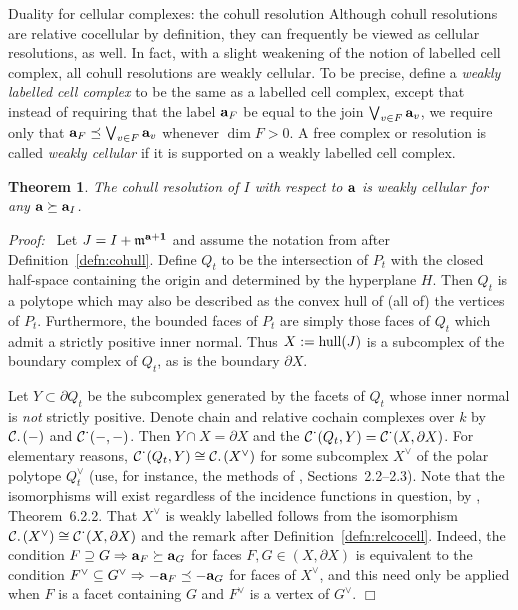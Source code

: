 \documentclass[12pt,leqno]{article}
\newtheorem{thm}{Theorem}[section]
\def\hdot{{^{\textstyle \cdot}}}
\def\ldot{{.{\scriptstyle \,}}}
\def\aa{{{\rm \bf a}}}
\def\mm{{\mathfrak m}}
\begin{document}
\begin{section}{Duality for cellular complexes: the cohull resolution}
Although cohull resolutions are relative cocellular by definition, they
can frequently be viewed as cellular resolutions, as well.  In fact, with
a slight weakening of the notion of labelled cell complex, all cohull
resolutions are weakly cellular.  To be precise, define a {\it weakly
labelled cell complex} to be the same as a labelled cell complex, except
that instead of requiring that the label $\aa_F$ be equal to the join
$\bigvee_{v \in F} \aa_v$, we require only that $\aa_F \preceq \bigvee_{v
\in F} \aa_v$ whenever $\dim F > 0$.  A free complex or resolution is
called {\it weakly cellular} if it is supported on a weakly labelled cell
complex.

\begin{thm} \label{thm:weakly}
The cohull resolution of $I$ with respect to $\aa$ is weakly cellular for
any $\aa \succeq \aa_I$.
\end{thm}
{\it Proof:\ } Let $J = I + \mm^{\aa + {\bf 1}}$ and assume the notation
from after Definition~\ref{defn:cohull}.  Define $Q_t$ to be the
intersection of $P_t$ with the closed half-space containing the origin
and determined by the hyperplane $H$.  Then $Q_t$ is a polytope which may
also be described as the convex hull of (all of) the vertices of $P_t$.
Furthermore, the bounded faces of $P_t$ are simply those faces of $Q_t$
which admit a strictly positive inner normal.  Thus $X := {\rm hull}(J)$
is a subcomplex of the boundary complex of $Q_t$, as is the boundary
$\partial X$.

Let $Y \subset \partial Q_t$ be the subcomplex generated by the facets of
$Q_t$ whose inner normal is {\it not} strictly positive.  Denote chain
and relative cochain complexes over $k$ by ${\cal C}\ldot(-)$ and ${\cal
C}\hdot(-,-)$.  Then $Y \cap X = \partial X$ and the ${\cal
C}\hdot(Q_t,Y) = {\cal C}\hdot(X,\partial X)$.  For elementary reasons,
${\cal C}\hdot(Q_t,Y) \cong {\cal C}\ldot(X^\vee)$ for some subcomplex
$X^\vee$ of the polar polytope $Q_t^\vee$ (use, for instance, the methods
of \cite{Zie}, Sections~2.2--2.3).  Note that the isomorphisms will exist
regardless of the incidence functions in question, by \cite{BH},
Theorem~6.2.2.  That $X^\vee$ is weakly labelled follows from the
isomorphism ${\cal C}\ldot(X^\vee) \cong {\cal C}\hdot(X,\partial X)$ and
the remark after Definition~\ref{defn:relcocell}.  Indeed, the condition
$F \supseteq G \Rightarrow \aa_F \succeq \aa_G$ for faces $F,G \in
(X,\partial X)$ is equivalent to the condition $F^\vee \subseteq G^\vee
\Rightarrow -\aa_F \preceq -\aa_G$ for faces of $X^\vee$, and this need
only be applied when $F$ is a facet containing $G$ and $F^\vee$ is a
vertex of $G^\vee$.
%
\hfill
$\Box$


\end{section}
\end{document}

